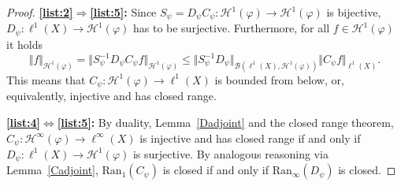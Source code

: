 \documentclass{amsart}
\def\Hil{\mathcal{H}}
\newcommand{\B}[0]{{\mathcal{B}}}
\newcommand{\N}[0]{{\mathbb{N}}}
\newcommand{\A}[0]{{\mathcal{A}}}
\renewcommand{\H}{{\mathcal{H}}}
\begin{document}
\begin{proof}
\textbf{\ref{list:2}$\Rightarrow$\ref{list:5}:} Since $S_\psi=D_\psi C_\psi : \H^1(\varphi) \to \H^1(\varphi)$ is bijective, $D_\psi:\ell^1(X)\to \H^1(\varphi)$ has to be surjective. Furthermore, for all $f\in \Hil^1(\varphi)$ it holds 
$$\Vert f \Vert_{\Hil^1(\varphi)} = \Vert S_\psi^{-1} D_{\psi} C_{\psi} f \Vert_{\Hil^1(\varphi)} \leq \Vert S_\psi^{-1} D_{\psi} \Vert_{\B(\ell^1(X),\Hil^1(\varphi))} \Vert C_{\psi} f \Vert_{\ell^1(X)}.$$
This means that $C_{\psi}:\Hil^1(\varphi) \to \ell^1(X)$ is bounded from below, or, equivalently, injective and has closed range.
%
\medskip

\textbf{\ref{list:4}$\Leftrightarrow$\ref{list:5}:} By duality, Lemma~\ref{Dadjoint} and the closed range theorem, $C_{\psi}:\Hil^{\infty}(\varphi) \to \ell^{\infty}(X)$ is injective and has closed range if and only if $D_{\psi}:\ell^1(X)\to \Hil^1(\varphi)$ is surjective. By analogous reasoning via Lemma~\ref{Cadjoint}, $\text{Ran}_{1}(C_\psi)$ is closed if and only if $\text{Ran}_{\infty}(D_\psi)$ is closed.\medskip


\end{proof}
\end{document}
